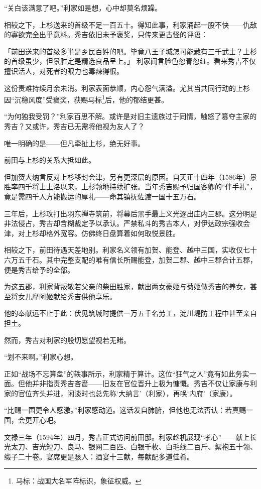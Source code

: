 \documentclass[
]{article}
\begin{document}
``关白该满意了吧。''利家如是想，心中却莫名烦躁。

相较之下，上杉送来的首级不足一百五十。得知此事，利家涌起一股不快------仇敌的寡欲完全出乎意料。秀吉依旧未予褒奖，只传来更古怪的评语：

「前田送来的首级多半是乡民百姓的吧。毕竟八王子城怎可能藏有三千武士？上杉的首级虽少，但景胜定是精选良品呈上。」
利家闻言脸色忽青忽红。看来秀吉不仅擅识活人，对死者的眼力也毒辣得很。

这份责难持续月余未消。利家表面恭顺，内心怨气满溢。尤其当共同行动的上杉因``沉稳风度''受褒奖，获赐马标\footnote{马标：战国大名军阵标识，象征权威。}后，他的郁结更甚。

``为何独我受罚？''利家百思不解。或许是对旧主遗族过于同情，触怒了篡夺主家的秀吉？又或许，秀吉已无需将他视为友人了？

唯一明确的是------但凡牵扯上杉，绝无好事。

前田与上杉的关系大抵如此。

但加贺大纳言反对上杉移封会津，另有更深层的原因。自天正十四年（1586年）景胜率四千将士上洛以来，上杉领地持续扩张。当年秀吉赐予归国客卿的``伴手礼''，竟是需四千人方能搬运的厚礼------命其镇抚佐渡一国十五万石。

三年后，上杉攻打出羽东禅寺筑前，将幕后黑手最上义光逐出庄内三郡。这分明是非法侵占，秀吉却含糊裁定予以承认。严禁私斗的秀吉本人，对伊达政宗强收会津，对上杉却格外宽容。仿佛终日盘算着如何取悦景胜。

相较之下，前田待遇天差地别。利家名义领有加贺、能登、越中三国，实收仅七十六万五千石。其中完整支配的唯有信长所赐能登，加贺二郡、越中三郡合计五郡，便是秀吉给予的全部。

为这五郡，利家背叛敬若父亲的柴田胜家，献出两女豪姬与菊姬做秀吉的养女，甚至将女儿摩阿姬献给秀吉供他享乐。

他的奉献远不止于此：伏见筑城时提供一万五千名劳工，淀川堤防工程中甚至亲自担土。

然而，秀吉对利家的殷切愿望视若无睹。

``划不来啊。''利家心想。

正如``战场不忘算盘''的轶事所示，利家精于算计。这位``狂气之人''竟有如此务实一面。但他并非指责秀吉吝啬------旧友在官位晋升上极为慷慨。秀吉不仅让家康与利家的官位齐头并进，闲谈时也总先称`大纳言'（利家），再唤`内府'（家康）。

``比赐一国更令人感激。''利家感动道。这话发自肺腑，但他也无法否认：若真赐一国，会更开心吧。

文禄三年（1594年）四月，秀吉正式访问前田邸。利家趁机展现``孝心''------献上长光太刀、吉光短刀、良马、银网二百匹、白银千枚、白毛线二百斤、絮袍五十领、缎子二十卷。宴席更是骇人：酒宴十三献，每献配多道佳肴。
\end{document}

